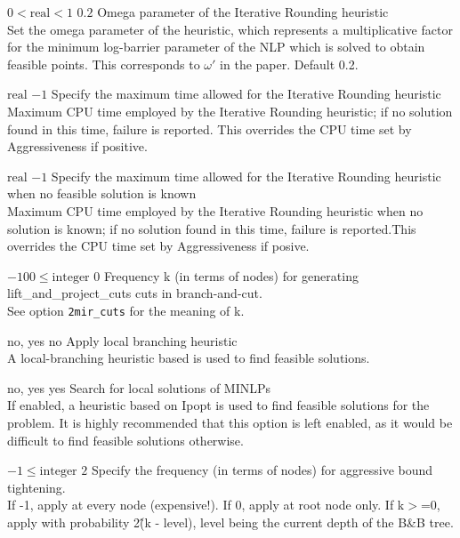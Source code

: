%
{$0<\textrm{real}<1$}%
{$0.2$}%
{Omega parameter of the Iterative Rounding heuristic\\
Set the omega parameter of the heuristic, which represents a multiplicative factor for the minimum log-barrier parameter of the NLP which is solved to obtain feasible points. This corresponds to $\omega'$ in the paper. Default 0.2.}%
{}

%
{$\textrm{real}$}%
{$-1$}%
{Specify the maximum time allowed for the Iterative Rounding heuristic\\
Maximum CPU time employed by the Iterative Rounding heuristic; if no solution found in this time, failure is reported. This overrides the CPU time set by Aggressiveness if positive.}%
{}

%
{$\textrm{real}$}%
{$-1$}%
{Specify the maximum time allowed for the Iterative Rounding heuristic when no feasible solution is known\\
Maximum CPU time employed by the Iterative Rounding heuristic when no solution is known; if no solution found in this time, failure is reported.This overrides the CPU time set by Aggressiveness if  posive.}%
{}

%
{$-100\leq\textrm{integer}$}%
{$0$}%
{Frequency k (in terms of nodes) for generating lift\_and\_project\_cuts cuts in branch-and-cut.\\
See option \texttt{2mir\_cuts} for the meaning of k.}%
{}

%
{\ttfamily no, yes}%
{no}%
{Apply local branching heuristic\\
A local-branching heuristic based is used to find feasible solutions.}%
{}

%
{\ttfamily no, yes}%
{yes}%
{Search for local solutions of MINLPs\\
If enabled, a heuristic based on Ipopt is used to find feasible solutions for the problem. It is highly recommended that this option is left enabled, as it would be difficult to find feasible solutions otherwise.}%
{}

%
{$-1\leq\textrm{integer}$}%
{$2$}%
{Specify the frequency (in terms of nodes) for aggressive bound tightening.\\
If -1, apply at every node (expensive!). If 0, apply at root node only. If k$>$=0, apply with probability 2\^(k - level), level being the current depth of the B\&B tree.}%
{}

